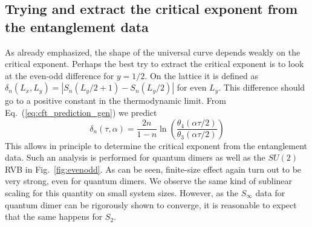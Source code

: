 \documentclass[11pt]{iopart}
\begin{document}
\subsection{Trying and extract the critical exponent from the entanglement data}
\label{sec:extraction}
As already emphasized, the shape of the universal curve depends weakly on the critical exponent. 
Perhaps the best try to extract the critical exponent is to look at the even-odd difference for $y=1/2$. On the lattice it is defined as $\delta_n(L_x,L_y)=\left|S_n(L_y/2+1)-S_n(L_y/2)\right|$ for even $L_y$. This difference should go to a positive constant in the thermodynamic limit. From Eq.~(\ref{eq:cft_prediction_gen}) we predict
\begin{equation}\label{eq:even_odd}
 \delta_n(\tau,\alpha)=\frac{2n}{1-n}\ln \left(\frac{\theta_4(\alpha\tau/2)}{\theta_3(\alpha \tau/2)}\right)
\end{equation}
This allows in principle to determine the critical exponent from the entanglement data. Such an analysis is performed for quantum dimers as well as the $SU(2)$ RVB in Fig.~\ref{fig:evenodd}. As can be seen, finite-size effect again turn out to be very strong, even for quantum dimers. We observe the same kind of sublinear scaling for this quantity on small system sizes\cite{Ju2012}. However, as the $S_\infty$ data for quantum dimer can be rigorously shown to converge, it is reasonable to expect that the same happens for $S_2$.
\end{document}
